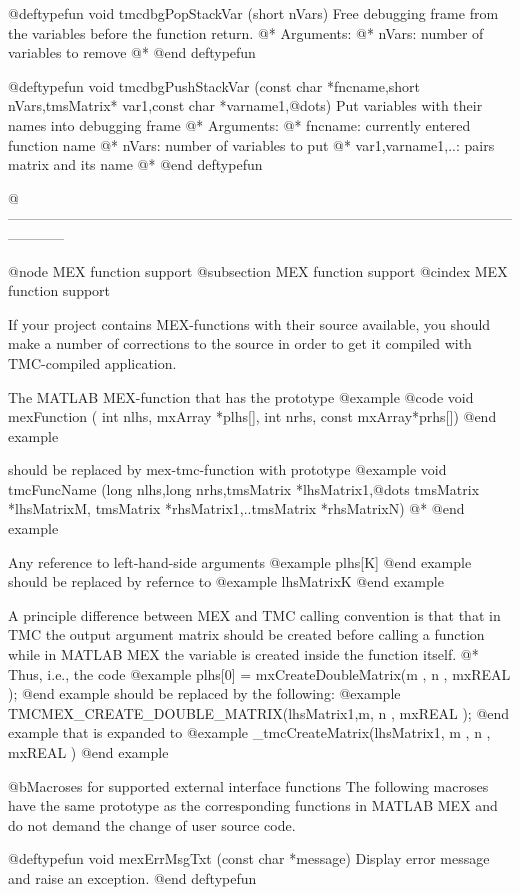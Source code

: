 @deftypefun       void tmcdbgPopStackVar (short nVars)
Free debugging frame from the variables before the function return. @*
Arguments: @*
	nVars: number of variables to remove @*
@end deftypefun


@deftypefun         void tmcdbgPushStackVar (const char *fncname,short nVars,tmsMatrix* var1,const char *varname1,@dots{})
Put variables with their names into debugging frame @*
Arguments: @*
	fncname: currently entered function name @*
	nVars: number of variables to put @*
	var1,varname1,..: pairs matrix and its name  @*
@end deftypefun


@------------------------------------------------------------------------------------------------------------------------

@node MEX function support
@subsection MEX function support
@cindex MEX function support

If your project contains MEX-functions with their source available, you should 
make a number of  corrections to the source in order to get it compiled with TMC-compiled application.

The MATLAB MEX-function that has the prototype  
@example
@code{ void mexFunction ( int nlhs, mxArray *plhs[], int nrhs,
 const mxArray*prhs[])}  
@end example

should be replaced by mex-tmc-function with prototype
@example
  void tmcFuncName (long nlhs,long nrhs,tmsMatrix *lhsMatrix1,@dots{}
tmsMatrix *lhsMatrixM, tmsMatrix *rhsMatrix1,..tmsMatrix *rhsMatrixN) @*
@end example

Any reference to left-hand-side arguments
@example
	plhs[K] 	
@end example
should be replaced by refernce to
@example
 lhsMatrixK
@end example

A principle difference between MEX and TMC calling convention is that that in TMC the output argument matrix 
should be created before calling a function while in MATLAB MEX the variable is created inside the function itself. @*
Thus, i.e., the code 
@example
	plhs[0] = mxCreateDoubleMatrix(m , n  , mxREAL ); 
@end example 
should be replaced by the following:
@example
	TMCMEX_CREATE_DOUBLE_MATRIX(lhsMatrix1,m, n , mxREAL ); 
@end example 
that is expanded to 
@example
	_tmcCreateMatrix(lhsMatrix1, m , n , mxREAL ) 
@end example

@b{Macroses for supported external interface functions}
The following macroses have the same prototype as the corresponding functions in MATLAB MEX and do not demand the change of user source code.

@deftypefun  void mexErrMsgTxt (const char *message) 
Display error message and raise an exception.
@end deftypefun

